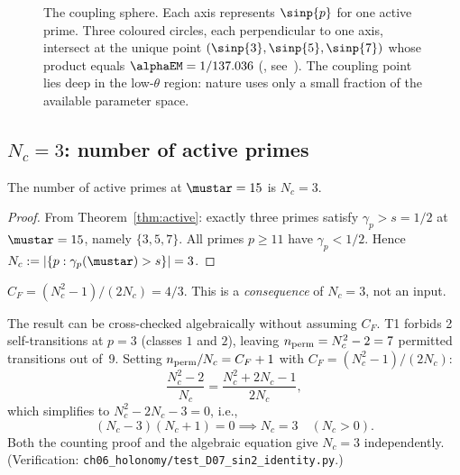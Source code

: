 \documentclass[12pt,a4paper]{article}
\begin{document}
\begin{figure}[htbp]
\caption{The coupling sphere.
  Each axis represents $\sinp{p}$ for one active prime.
  Three coloured circles, each perpendicular to one axis, intersect at the unique point
  $(\sinp{3}, \sinp{5}, \sinp{7})$ whose product equals
  $\alphaEM = 1/137.036$ (\BRIDGETAG, see~\cite{companion_M5}).
  The coupling point lies deep in the low-$\theta$ region:
  nature uses only a small fraction of the available parameter space.}
\label{fig:coupling_cube}
\end{figure}

\subsection{$N_c = 3$: number of active primes}
\label{sec:Nc_3}

\mTHM
\begin{theorem}[$N_c = 3$]
\label{thm:Nc_3}
The number of active primes at $\mustar = 15$ is $N_c = 3$.

\begin{proof}
From Theorem~\ref{thm:active}: exactly three primes satisfy
$\gamma_p > s = 1/2$ at $\mustar = 15$, namely $\{3, 5, 7\}$.
All primes $p \geq 11$ have $\gamma_p < 1/2$.
Hence $N_c := |\{p : \gamma_p(\mustar) > s\}| = 3$.
\end{proof}
\end{theorem}

\begin{corollary}
\label{cor:CF}
$C_F = (N_c^2 - 1)/(2N_c) = 4/3$.
This is a \emph{consequence} of $N_c = 3$, not an input.
\end{corollary}

\begin{remark}
\label{rem:Nc_algebraic}
The result can be cross-checked algebraically without assuming $C_F$.
T1 forbids 2 self-transitions at $p = 3$ (classes $1$ and $2$),
leaving $n_{\rm perm} = N_c^2 - 2 = 7$ permitted transitions out of~9.
Setting $n_{\rm perm}/N_c = C_F + 1$ with $C_F = (N_c^2 - 1)/(2N_c)$:
\[
  \frac{N_c^2 - 2}{N_c} = \frac{N_c^2 + 2N_c - 1}{2N_c},
\]
which simplifies to $N_c^2 - 2N_c - 3 = 0$, i.e.,
\begin{equation}
  (N_c - 3)(N_c + 1) = 0 \implies N_c = 3 \quad (N_c > 0).
  \label{eq:Nc_equation}
\end{equation}
Both the counting proof and the algebraic equation give $N_c = 3$
independently. (Verification: \texttt{ch06\_holonomy/test\_D07\_sin2\_identity.py}.)
\end{remark}
\end{document}
